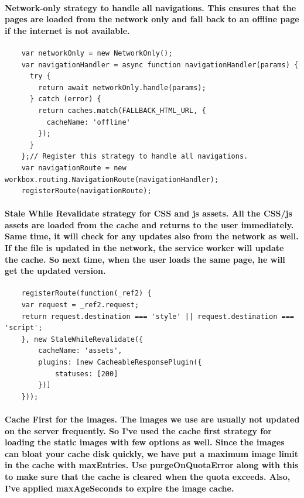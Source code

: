 \documentclass[12pt,a4paper]{article}
\begin{document}
    \paragraph{Network-only strategy to handle all navigations. This ensures that the pages are loaded from the network only and fall back to an offline page if the internet is not available.}

    \begin{verbatim}
    var networkOnly = new NetworkOnly();
    var navigationHandler = async function navigationHandler(params) {
      try {
        return await networkOnly.handle(params);
      } catch (error) {
        return caches.match(FALLBACK_HTML_URL, {
          cacheName: 'offline'
        });
      }
    };// Register this strategy to handle all navigations.
    var navigationRoute = new workbox.routing.NavigationRoute(navigationHandler);
    registerRoute(navigationRoute);
    \end{verbatim}

    \paragraph{Stale While Revalidate strategy for CSS and js assets. All the CSS/js assets are loaded from the cache and returns to the user immediately. Same time, it will check for any updates also from the network as well. If the file is updated in the network, the service worker will update the cache. So next time, when the user loads the same page, he will get the updated version.}

    \begin{verbatim}
    registerRoute(function(_ref2) {
    var request = _ref2.request;
    return request.destination === 'style' || request.destination === 'script';
    }, new StaleWhileRevalidate({
        cacheName: 'assets',
        plugins: [new CacheableResponsePlugin({
            statuses: [200]
        })]
    }));
    \end{verbatim}

    \paragraph{Cache First for the images. The images we use are usually not updated on the server frequently. So I’ve used the cache first strategy for loading the static images with few options as well. Since the images can bloat your cache disk quickly, we have put a maximum image limit in the cache with maxEntries. Use purgeOnQuotaError along with this to make sure that the cache is cleared when the quota exceeds. Also, I’ve applied maxAgeSeconds to expire the image cache.}
\end{document}
